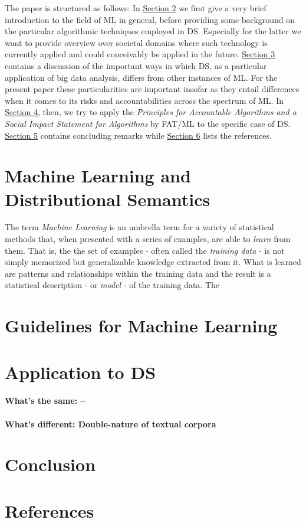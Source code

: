 \documentclass{article}
\begin{document}
The paper is structured as follows: In \hyperlink{sec2}{Section 2} we first give a very brief introduction to the field of ML in general, before providing some background on the particular algorithmic techniques employed in DS. Especially for the latter we want to provide overview over societal domains where such technology is currently applied and could conceivably be applied in the future. \hyperlink{sec3}{Section 3} contains a discussion of the important ways in which DS, as a particular application of big data analysis, differs from other instances of ML. For the present paper these particularities are important insofar as they entail differences when it comes to its risks and accountabilities across the spectrum of ML. In \hyperlink{sec4}{Section 4}, then, we try to apply the \emph{Principles for Accountable Algorithms and a Social Impact Statement for Algorithms} by FAT/ML to the specific case of DS. \hyperlink{sec5}{Section 5} contains concluding remarks while \hyperlink{sec6}{Section 6} lists the references.
\section{Machine Learning and Distributional Semantics}\hypertarget{sec3}{ }
The term \emph{Machine Learning} is an umbrella term for a variety of statistical methods that, when presented with a series of examples, are able to \emph{learn} from them. That is, the the set of examples - often called the \emph{training data} - is not simply memorized but generalizable knowledge extracted from it. \cite{domingos2012few}
 What is learned are patterns and relationships within the training data and the result is a statistical description - or \emph{model} - of the training data. \cite{fayyad2001digital}  
 The
\section{Guidelines for Machine Learning}\hypertarget{sec2}{}

\section{Application to DS}\hypertarget{sec4}{ }
\paragraph{What's the same: --}
\paragraph{What's different: Double-nature of textual corpora}
\section{Conclusion}

\section{References}\hypertarget{sec5}{ }
\end{document}
